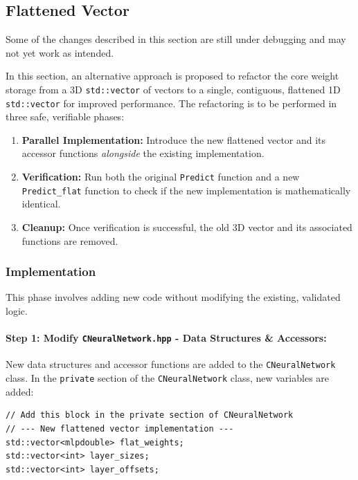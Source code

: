\documentclass{article}
\begin{document}
\subsection{Flattened Vector}
\begin{tcolorbox}[colback=bg,colframe=red!60!black,title=Disclaimer]
Some of the changes described in this section are still under debugging and may not yet work as intended.
\end{tcolorbox}
In this section, an alternative approach is proposed to refactor the core weight storage from a 3D \texttt{std::vector} of vectors to a single, contiguous, flattened 1D \texttt{std::vector} for improved performance. The refactoring is to be performed in three safe, verifiable phases:
\begin{enumerate}
    \item \textbf{Parallel Implementation:} Introduce the new flattened vector and its accessor functions \emph{alongside} the existing implementation.
    \item \textbf{Verification:} Run both the original \texttt{Predict} function and a new \texttt{Predict\_flat} function to check if the new implementation is mathematically identical.
    \item \textbf{Cleanup:} Once verification is successful, the old 3D vector and its associated functions are removed.
\end{enumerate}

\subsubsection{Implementation}
This phase involves adding new code without modifying the existing, validated logic.
\paragraph{Step 1: Modify \texttt{CNeuralNetwork.hpp} - Data Structures \& Accessors:}

New data structures and accessor functions are added to the \texttt{CNeuralNetwork} class. In the \texttt{private} section of the \texttt{CNeuralNetwork} class, new variables are added:

\begin{verbatim}
// Add this block in the private section of CNeuralNetwork
// --- New flattened vector implementation ---
std::vector<mlpdouble> flat_weights;
std::vector<int> layer_sizes;
std::vector<int> layer_offsets;
\end{verbatim}
\end{document}
